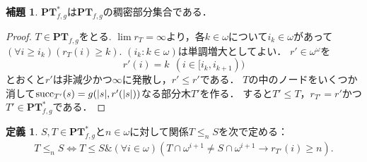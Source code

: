 \documentclass[uplatex]{jsarticle}
\newcommand{\suc}{\operatorname{succ}}
\newcommand{\PTfg}{\mathbf{PT}_{f,g}}
\newcommand{\AND}{\mathbin{\&}}
\DeclarePairedDelimiter\abs{\lvert}{\rvert}
\theoremstyle{definition}
\newtheorem{defi}[thm]{定義}
\newtheorem{lem}[thm]{補題}
\begin{document}
	\begin{lem}
		$\PTfg^*$は$\PTfg$の稠密部分集合である．
	\end{lem}
	\begin{proof}
			$T \in \PTfg$をとる.
			$\lim r_T = \infty$より，各$k \in \omega$について$i_k \in \omega$があって$(\forall i \ge i_k) (r_T(i) \ge k)$.
			$(i_k : k \in \omega)$は単調増大としてよい．
			$r' \in \omega^\omega$を
			\[
			r'(i) = k \ \ (i \in [i_k, i_{k+1}))
			\]
			とおくと$r'$は非減少かつ$\infty$に発散し，$r' \le r'$である．
			$T$の中のノードをいくつか消して$\suc_{T'}(s) = g(\abs{s}, r'(\abs{s}))$なる部分木$T'$を作る．
			すると$T' \le T$，$r_{T'} = r'$かつ$T' \in \PTfg^*$である．
	\end{proof}
	
	\begin{defi}
		$S, T \in \PTfg^*$と$n \in \omega$に対して関係$T \le_n S$を次で定める：
		\begin{align*}
			T \le_n S \Leftrightarrow T \le S \AND (\forall i \in \omega) (T \cap \omega^{i+1} \ne S \cap \omega^{i+1} \rightarrow r_{T'}(i) \ge n).
		\end{align*}
	\end{defi}
	
\end{document}

